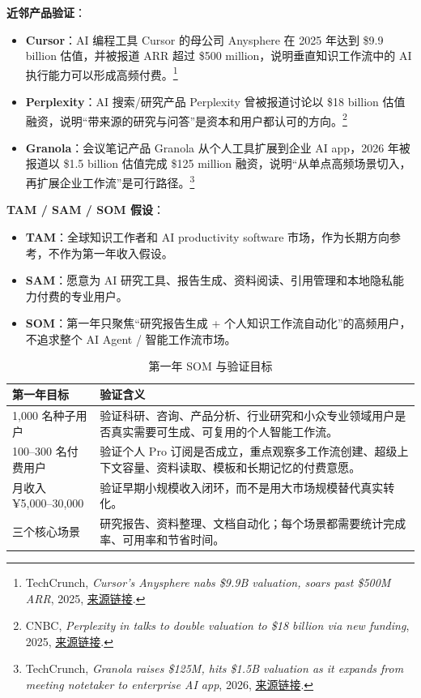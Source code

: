 \documentclass[12pt,a4paper]{ctexart}
\begin{document}
\textbf{近邻产品验证}：
\begin{itemize}
  \item \textbf{Cursor}：AI 编程工具 Cursor 的母公司 Anysphere 在 2025 年达到 \$9.9 billion 估值，并被报道 ARR 超过 \$500 million，说明垂直知识工作流中的 AI 执行能力可以形成高频付费。\footnote{TechCrunch, \emph{Cursor's Anysphere nabs \$9.9B valuation, soars past \$500M ARR}, 2025, \href{https://techcrunch.com/2025/06/05/cursors-anysphere-nabs-9-9b-valuation-soars-past-500m-arr/}{来源链接}.}
  \item \textbf{Perplexity}：AI 搜索/研究产品 Perplexity 曾被报道讨论以 \$18 billion 估值融资，说明“带来源的研究与问答”是资本和用户都认可的方向。\footnote{CNBC, \emph{Perplexity in talks to double valuation to \$18 billion via new funding}, 2025, \href{https://www.cnbc.com/amp/2025/03/20/perplexity-in-talks-to-double-valuation-to-18-billion-via-new-funding.html}{来源链接}.}
  \item \textbf{Granola}：会议笔记产品 Granola 从个人工具扩展到企业 AI app，2026 年被报道以 \$1.5 billion 估值完成 \$125 million 融资，说明“从单点高频场景切入，再扩展企业工作流”是可行路径。\footnote{TechCrunch, \emph{Granola raises \$125M, hits \$1.5B valuation as it expands from meeting notetaker to enterprise AI app}, 2026, \href{https://techcrunch.com/2026/03/25/granola-raises-125m-hits-1-5b-valuation-as-it-expands-from-meeting-notetaker-to-enterprise-ai-app/}{来源链接}.}
\end{itemize}

\textbf{TAM / SAM / SOM 假设}：
\begin{itemize}
  \item \textbf{TAM}：全球知识工作者和 AI productivity software 市场，作为长期方向参考，不作为第一年收入假设。
  \item \textbf{SAM}：愿意为 AI 研究工具、报告生成、资料阅读、引用管理和本地隐私能力付费的专业用户。
  \item \textbf{SOM}：第一年只聚焦“研究报告生成 + 个人知识工作流自动化”的高频用户，不追求整个 AI Agent / 智能工作流市场。
\end{itemize}

\begin{table}[htbp]
  \centering
  \small
  \begin{tabularx}{\textwidth}{p{3.2cm} X}
    \toprule
    \textbf{第一年目标} & \textbf{验证含义} \\
    \midrule
    1,000 名种子用户 & 验证科研、咨询、产品分析、行业研究和小众专业领域用户是否真实需要可生成、可复用的个人智能工作流。 \\
    100--300 名付费用户 & 验证个人 Pro 订阅是否成立，重点观察多工作流创建、超级上下文容量、资料读取、模板和长期记忆的付费意愿。 \\
    月收入 ¥5,000--30,000 & 验证早期小规模收入闭环，而不是用大市场规模替代真实转化。 \\
    三个核心场景 & 研究报告、资料整理、文档自动化；每个场景都需要统计完成率、可用率和节省时间。 \\
    \bottomrule
  \end{tabularx}
  \caption{第一年 SOM 与验证目标}
  \label{tab:first-year-som}
\end{table}
\end{document}
